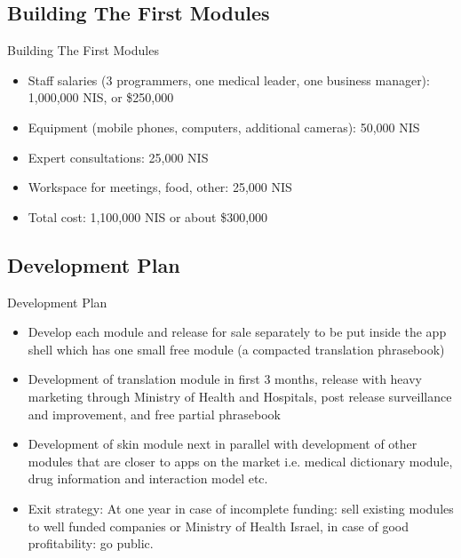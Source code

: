 \documentclass[presentation]{beamer}
\begin{document}
\subsection{Building The First Modules}
\label{sec-1-4}
\begin{frame}[label=sec-1-4-1]{Building The First Modules}
\begin{itemize}
\item Staff salaries (3 programmers, one medical leader, one business
manager): 1,000,000 NIS, or \$250,000
\item Equipment (mobile phones, computers, additional cameras): 50,000 NIS
\item Expert consultations: 25,000 NIS
\item Workspace for meetings, food, other: 25,000 NIS
\item Total cost: 1,100,000 NIS or about \$300,000
\end{itemize}
\end{frame}

\subsection{Development Plan}
\label{sec-1-5}
\begin{frame}[label=sec-1-5-1]{Development Plan}
\begin{itemize}
\item Develop each module and release for sale separately to be put inside
the app shell which has one small free module (a compacted
translation phrasebook)
\item Development of translation module in first 3 months, release with
heavy marketing through Ministry of Health and Hospitals, post
release surveillance and improvement, and free partial phrasebook
\item Development of skin module next in parallel with development of
other modules that are closer to apps on the market i.e. medical
dictionary module, drug information and interaction model etc.
\item Exit strategy: At one year in case of incomplete funding: sell
existing modules to well funded companies or Ministry of Health
Israel, in case of good profitability: go public.
\end{itemize}
\end{frame}
\end{document}
